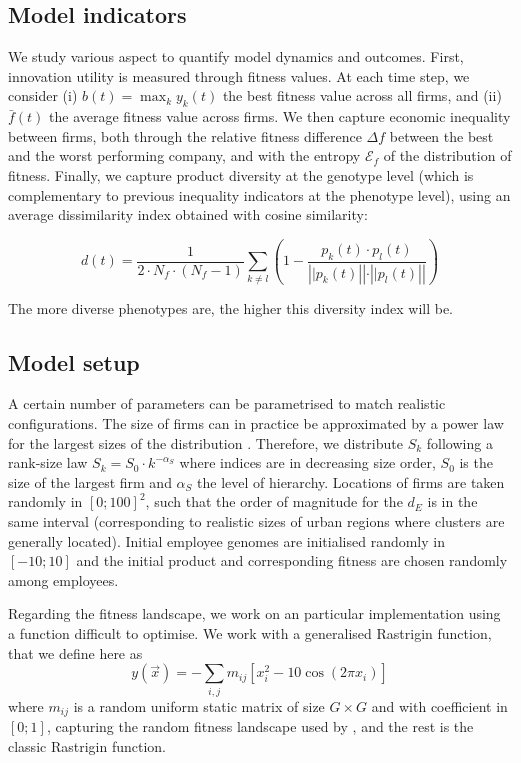 \documentclass[letterpaper]{article}
\begin{document}
\subsection{Model indicators}

We study various aspect to quantify model dynamics and outcomes. First, innovation utility is measured through fitness values. At each time step, we consider (i) $b(t) = \max_k y_k (t)$ the best fitness value across all firms, and (ii) $\bar{f} (t)$ the average fitness value across firms. We then capture economic inequality between firms, both through the relative fitness difference $\Delta f$ between the best and the worst performing company, and with the entropy $\mathcal{E}_f$ of the distribution of fitness. Finally, we capture product diversity at the genotype level (which is complementary to previous inequality indicators at the phenotype level), using an average dissimilarity index obtained with cosine similarity:

\[
d(t) = \frac{1}{2 \cdot N_f \cdot (N_f - 1)} \sum_{k \neq l} \left(1 - \frac{p_k (t)\cdot p_l (t)}{\left||p_k (t)\right|| \cdot \left||p_l (t)\right||}\right)
\]

The more diverse phenotypes are, the higher this diversity index will be.

\subsection{Model setup}

A certain number of parameters can be parametrised to match realistic configurations. The size of firms can in practice be approximated by a power law for the largest sizes of the distribution \citep{growiec2008size}. Therefore, we distribute $S_k$ following a rank-size law $S_k = S_0 \cdot k^{-\alpha_S}$ where indices are in decreasing size order, $S_0$ is the size of the largest firm and $\alpha_S$ the level of hierarchy. Locations of firms are taken randomly in $\left[0 ; 100 \right]^2$, such that the order of magnitude for the $d_E$ is in the same interval (corresponding to realistic sizes of urban regions where clusters are generally located). Initial employee genomes are initialised randomly in $[-10 ; 10]$ and the initial product and corresponding fitness are chosen randomly among employees.

Regarding the fitness landscape, we work on an particular implementation using a function difficult to optimise. We work with a generalised Rastrigin function, that we define here as
\[
y(\vec{x}) = - \sum_{i,j} m_{ij} \left[x_i^2 - 10 \cos\left(2 \pi x_i\right) \right]
\]
where $m_{ij}$ is a random uniform static matrix of size $G \times G$ and with coefficient in $[0;1]$, capturing the random fitness landscape used by  \cite{ma2005agent}, and the rest is the classic Rastrigin function.
\end{document}
